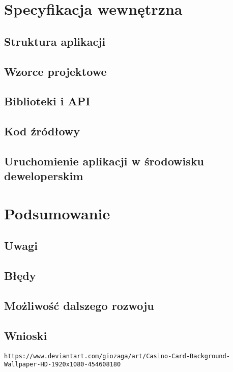 \documentclass[a4paper,11pt,titlepage]{article}
\begin{document}
\section{Specyfikacja wewnętrzna}
\subsection{Struktura aplikacji}


\subsection{Wzorce projektowe}


\subsection{Biblioteki i API}

\subsection{Kod źródłowy}

\subsection{Uruchomienie aplikacji w środowisku deweloperskim}



\section{Podsumowanie}
\subsection{Uwagi}


\subsection{Błędy}


\subsection{Możliwość dalszego rozwoju}

\subsection{Wnioski}


\newpage
{}
\listoffigures
\newpage

\begin{thebibliography}{9}
\verb|https://www.deviantart.com/giozaga/art/Casino-Card-Background-Wallpaper-HD-1920x1080-454608180|



\end{thebibliography}
\end{document}
